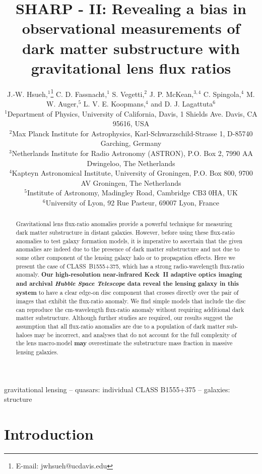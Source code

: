 \documentclass[a4paper,fleqn,usenatbib,useAMS]{mnras}
\title[Beware the effect of edge-on discs]{SHARP - II: Revealing a bias in observational measurements of dark matter substructure with gravitational lens flux ratios}
\author[Hsueh et al.]{J.-W. Hsueh,$^{1}$\thanks{E-mail: jwhsueh@ucdavis.edu} C. D. Fassnacht,$^{1}$ S. Vegetti,$^{2}$  J. P. McKean,$^{3,4}$ C. Spingola,$^{4}$ M. W. Auger,$^{5}$
\newauthor  L. V. E. Koopmans,$^{4}$ and D. J. Lagattuta$^{6}$\\
$^{1}$Department of Physics, University of California, Davis, 1 Shields Ave. Davis, CA 95616, USA\\
$^{2}$Max Planck Institute for Astrophysics, Karl-Schwarzschild-Strasse 1, D-85740 Garching, Germany\\
$^{3}$Netherlands Institute for Radio Astronomy (ASTRON), P.O. Box 2, 7990 AA Dwingeloo, The Netherlands\\
$^{4}$Kapteyn Astronomical Institute, University of Groningen, P.O. Box 800, 9700 AV Groningen, The Netherlands\\
$^{5}$Institute of Astronomy, Madingley Road, Cambridge CB3 0HA, UK\\
$^{6}$University of Lyon, 92 Rue Pasteur, 69007 Lyon, France}
\begin{document}

\pagerange{\pageref{firstpage}--\pageref{lastpage}} 

\maketitle

\label{firstpage}

\begin{abstract}
Gravitational lens flux-ratio anomalies provide a powerful technique for measuring dark matter substructure in distant galaxies. However, before using these flux-ratio anomalies to test galaxy formation models, it is imperative to ascertain that the given anomalies are indeed due to the presence of dark matter substructure and not due to some other component of the lensing galaxy halo or to propagation effects. Here we present the case of CLASS~B1555+375, which has a strong radio-wavelength flux-ratio anomaly.  {\bf Our high-resolution near-infrared Keck~II adaptive optics imaging and archival {\it Hubble Space Telescope} data reveal the lensing galaxy in this system} to have  a clear edge-on disc component that crosses directly over the pair of images that exhibit the flux-ratio anomaly. We find simple models that include the disc can reproduce the cm-wavelength flux-ratio anomaly without requiring additional dark matter substructure. Although further studies are required, our results suggest the assumption that all flux-ratio anomalies are due to a population of dark matter sub-haloes may be incorrect, and analyses that do not account for the full complexity of the lens macro-model {\bf may} overestimate the substructure mass fraction in massive lensing galaxies.
\end{abstract}

\begin{keywords}
gravitational lensing -- quasars: individual CLASS B1555+375 -- galaxies: structure 
\end{keywords}

\section{Introduction}
\end{document}

